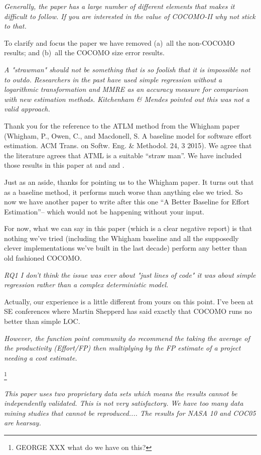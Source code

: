 \documentclass[smallcondesed]{svjour3}
\begin{document}
{\em  Generally, the paper has a large number of different elements  that makes it difficult to follow. If you are interested in the value of COCOMO-II why not stick to that.
}

To clarify and focus the paper we have removed (a)~all the non-COCOMO results;
and (b)~all the COCOMO size error results.

{\em A "strawman" should not be something that is so
  foolish that it is impossible not to
  outdo. Researchers in the past have used simple
  regression without a logarithmic transformation
  and MMRE as an accuracy measure for comparison
  with new estimation methods.  Kitchenham \& Mendes
  pointed out this was not a valid approach.}

Thank you for the reference to the ATLM method from
the Whigham paper (Whigham, P., Owen, C., and
Macdonell, S. A baseline model for software effort
estimation. ACM Trans. on Softw. Eng. \&
Methodol. 24, 3 2015). We agree that the literature
agrees that ATML is a suitable ``straw man''. We
have included those results in this paper at
 and  and  .

Just as an aside, thanks for pointing us to
the  Whigham paper. It turns out that  as a baseline method,
it performs much worse than anything else we tried. So now we have another paper
to write after this one ``A Better Baseline for Effort Estimation''-- which would
not be happening without your input.

For now, what we can say in this paper (which is a clear negative report) is
that nothing we've tried (including the Whigham baseline and
all the supposedly clever implementations
we've built in the last decade) perform any better than old fashioned COCOMO.

{\em RQ1 I don't think the issue was ever about "just lines of code" it was about simple regression rather than a complex  deterministic model. }

Actually, our experience is a little different from yours on this point.
I've been at SE conferences where Martin Shepperd  has said exactly that COCOMO
runs no better than simple LOC.

{\em However,  the function point community do recommend the taking the average of the productivity (Effort/FP) then multiplying by the FP estimate of a project needing a cost estimate.}

\footnote{GEORGE XXX what do we have on this?}

{\em 
  This paper uses two proprietary data sets which means the results cannot be independently validated. This is not very satisfactory. We have too many data mining studies that cannot be reproduced....
The results for NASA 10 and COC05 are hearsay.}
\end{document}
